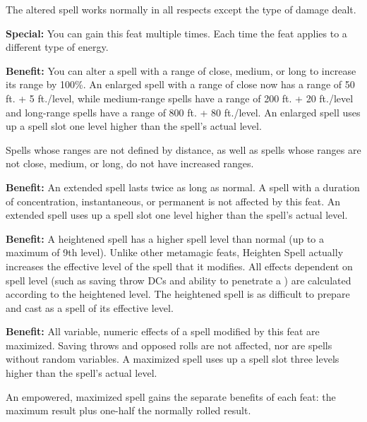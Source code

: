 The altered spell works normally in all respects except the type of damage dealt. 

\textbf{Special:} You can gain this feat multiple times. Each time the feat applies to a different type of energy.


\textbf{Benefit:} You can alter a spell with a range of close, medium, or long to increase its range by 100\%. An enlarged spell with a range of close now has a range of 50 ft. + 5 ft./level, while medium-range spells have a range of 200 ft. + 20 ft./level and long-range spells have a range of 800 ft. + 80 ft./level. An enlarged spell uses up a spell slot one level higher than the spell's actual level.

Spells whose ranges are not defined by distance, as well as spells whose ranges are not close, medium, or long, do not have increased ranges.


\textbf{Benefit:} An extended spell lasts twice as long as normal. A spell with a duration of concentration, instantaneous, or permanent is not affected by this feat. An extended spell uses up a spell slot one level higher than the spell's actual level.


\textbf{Benefit:} A heightened spell has a higher spell level than normal (up to a maximum of 9th level). Unlike other metamagic feats, Heighten Spell actually increases the effective level of the spell that it modifies. All effects dependent on spell level (such as saving throw DCs and ability to penetrate a ) are calculated according to the heightened level. The heightened spell is as difficult to prepare and cast as a spell of its effective level.


\textbf{Benefit:} All variable, numeric effects of a spell modified by this feat are maximized. Saving throws and opposed rolls are not affected, nor are spells without random variables. A maximized spell uses up a spell slot three levels higher than the spell's actual level.

An empowered, maximized spell gains the separate benefits of each feat: the maximum result plus one-half the normally rolled result.



